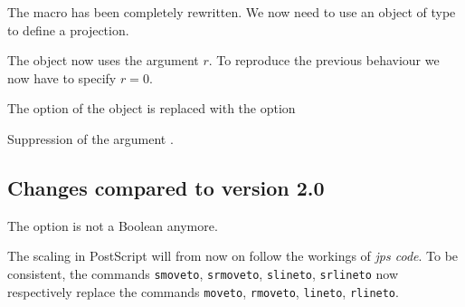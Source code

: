 \begin{compactitem}
\item The macro  has been completely rewritten. We now need to use an
object of type  to define a projection.
\item The object  now uses the argument $r$. To reproduce the previous behaviour
we now have to specify $r=0$.
\item The option  of the object  is replaced with the option
\item Suppression of the argument .
\end{compactitem}

\subsection{Changes compared to version 2.0}

\begin{compactitem}
\item The option  is not a Boolean anymore.
\item The scaling in PostScript will from now on follow the workings of \textit{jps code}.
To be consistent, the commands \verb+smoveto+,
\verb+srmoveto+, \verb+slineto+, \verb+srlineto+ now
respectively replace the commands \verb+moveto+,
\verb+rmoveto+, \verb+lineto+, \verb+rlineto+.
\end{compactitem}
